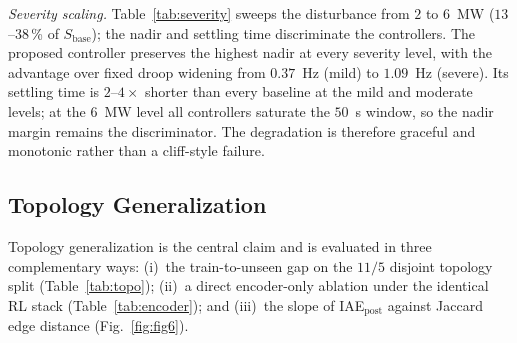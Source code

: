 \documentclass[lettersize,journal]{IEEEtran}
\begin{document}
\emph{Severity scaling.}
Table~\ref{tab:severity} sweeps the disturbance from $2$ to $6$~MW ($13$--$38$\,\% of $S_{\mathrm{base}}$); the nadir and settling time discriminate the controllers. The proposed controller preserves the highest nadir at every severity level, with the advantage over fixed droop widening from $0.37$~Hz (mild) to $1.09$~Hz (severe). Its settling time is $2$--$4\times$ shorter than every baseline at the mild and moderate levels; at the $6$~MW level all controllers saturate the $50$~s window, so the nadir margin remains the discriminator. The degradation is therefore graceful and monotonic rather than a cliff-style failure.
 
\subsection{Topology Generalization}
\label{ssec:res_topo}
 
Topology generalization is the central claim and is evaluated in three complementary ways: (i)~the train-to-unseen gap on the $11/5$ disjoint topology split (Table~\ref{tab:topo}); (ii)~a direct encoder-only ablation under the identical RL stack (Table~\ref{tab:encoder}); and (iii)~the slope of IAE$_{\mathrm{post}}$ against Jaccard edge distance (Fig.~\ref{fig:fig6}).
 
\begin{table}[!t]
\caption{Topology generalization on the generation-trip scenario: train ($11$) versus unseen ($5$) topologies.}
\label{tab:topo}
\centering
\footnotesize
{}
\end{table}
 
\end{document}
